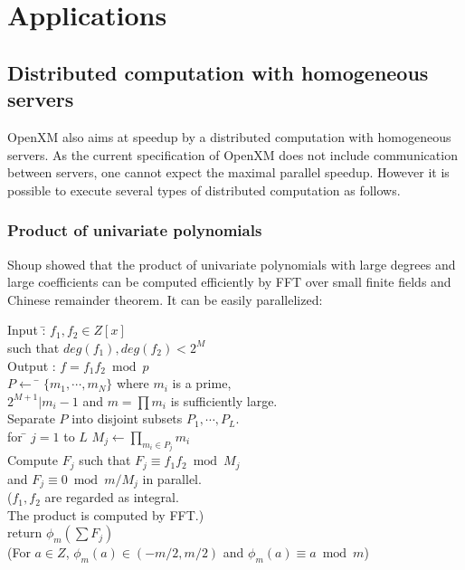 
\section{Applications}
\subsection{Distributed computation with homogeneous servers}

OpenXM also aims at speedup by a distributed computation
with homogeneous servers. As the current specification of OpenXM does
not include communication between servers, one cannot expect
the maximal parallel speedup. However it is possible to execute
several types of distributed computation as follows.

\subsubsection{Product of univariate polynomials}

Shoup \cite{Shoup} showed that the product of univariate polynomials
with large degrees and large coefficients can be computed efficiently
by FFT over small finite fields and Chinese remainder theorem.
It can be easily parallelized:

\begin{tabbing}
Input :\= $f_1, f_2 \in Z[x]$\\
\> such that $deg(f_1), deg(f_2) < 2^M$\\
Output : $f = f_1f_2 \bmod p$\\
$P \leftarrow$ \= $\{m_1,\cdots,m_N\}$ where $m_i$ is a prime, \\
\> $2^{M+1}|m_i-1$ and $m=\prod m_i $ is sufficiently large. \\
Separate $P$ into disjoint subsets $P_1, \cdots, P_L$.\\
for \= $j=1$ to $L$ $M_j \leftarrow \prod_{m_i\in P_j} m_i$\\
Compute $F_j$ such that $F_j \equiv f_1f_2 \bmod M_j$\\
\> and $F_j \equiv 0 \bmod m/M_j$ in parallel.\\
\> ($f_1, f_2$ are regarded as integral.\\
\> The product is computed by FFT.)\\
return $\phi_m(\sum F_j)$\\
(For $a \in Z$, $\phi_m(a) \in (-m/2,m/2)$ and $\phi_m(a)\equiv a \bmod m$)
\end{tabbing}

